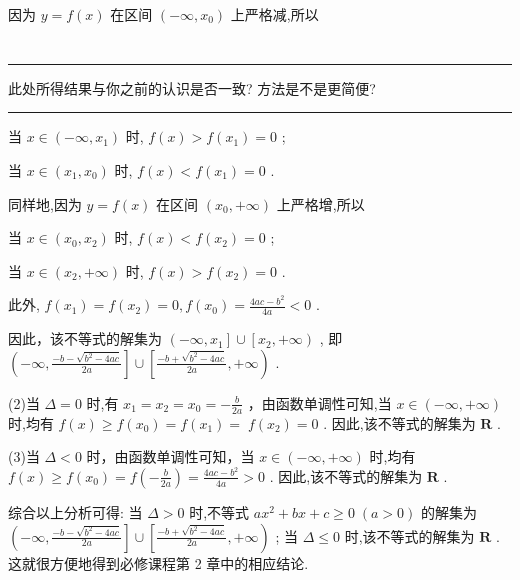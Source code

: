 \documentclass[10pt]{article}
\newcommand{\HRule}{\begin{center}\rule{0.9\linewidth}{0.2mm}\end{center}}
\begin{document}
因为 \(y = f\left( x\right)\) 在区间 \(\left( {-\infty ,{x}_{0}}\right)\) 上严格减,所以

\section*{}

\HRule

此处所得结果与你之前的认识是否一致? 方法是不是更简便?

\HRule



当 \(x \in  \left( {-\infty ,{x}_{1}}\right)\) 时, \(f\left( x\right)  > f\left( {x}_{1}\right)  = 0\) ;

当 \(x \in  \left( {{x}_{1},{x}_{0}}\right)\) 时, \(f\left( x\right)  < f\left( {x}_{1}\right)  = 0\) .

同样地,因为 \(y = f\left( x\right)\) 在区间 \(\left( {{x}_{0}, + \infty }\right)\) 上严格增,所以

当 \(x \in  \left( {{x}_{0},{x}_{2}}\right)\) 时, \(f\left( x\right)  < f\left( {x}_{2}\right)  = 0\) ;

当 \(x \in  \left( {{x}_{2}, + \infty }\right)\) 时, \(f\left( x\right)  > f\left( {x}_{2}\right)  = 0\) .

此外, \(f\left( {x}_{1}\right)  = f\left( {x}_{2}\right)  = 0,f\left( {x}_{0}\right)  = \frac{{4ac} - {b}^{2}}{4a} < 0\) .

因此，该不等式的解集为 \(\left( {-\infty ,{x}_{1}}\right\rbrack   \cup  \left\lbrack  {{x}_{2}, + \infty }\right)\) , 即 \(\left( {-\infty ,\frac{-b - \sqrt{{b}^{2} - {4ac}}}{2a}}\right\rbrack   \cup  \left\lbrack  {\frac{-b + \sqrt{{b}^{2} - {4ac}}}{2a}, + \infty }\right)\) .

(2)当 \(\Delta  = 0\) 时,有 \({x}_{1} = {x}_{2} = {x}_{0} =  - \frac{b}{2a}\) ，由函数单调性可知,当 \(x \in  \left( {-\infty , + \infty }\right)\) 时,均有 \(f\left( x\right)  \geq  f\left( {x}_{0}\right)  = f\left( {x}_{1}\right)  = \; f\left( {x}_{2}\right)  = 0\) . 因此,该不等式的解集为 \(\mathbf{R}\) .

(3)当 \(\Delta  < 0\) 时，由函数单调性可知，当 \(x \in  \left( {-\infty , + \infty }\right)\) 时,均有 \(f\left( x\right)  \geq  f\left( {x}_{0}\right)  = f\left( {-\frac{b}{2a}}\right)  = \frac{{4ac} - {b}^{2}}{4a} > 0\) . 因此,该不等式的解集为 \(\mathbf{R}\) .

综合以上分析可得: 当 \(\Delta  > 0\) 时,不等式 \(a{x}^{2} + {bx} + c \geq  0 \; \left( {a > 0}\right)\) 的解集为 \(\left( {-\infty ,\frac{-b - \sqrt{{b}^{2} - {4ac}}}{2a}}\right\rbrack   \cup  \left\lbrack  {\frac{-b + \sqrt{{b}^{2} - {4ac}}}{2a}, + \infty }\right)\) ; 当 \(\Delta  \leq  0\) 时,该不等式的解集为 \(\mathbf{R}\) . 这就很方便地得到必修课程第 2 章中的相应结论.
\end{document}
